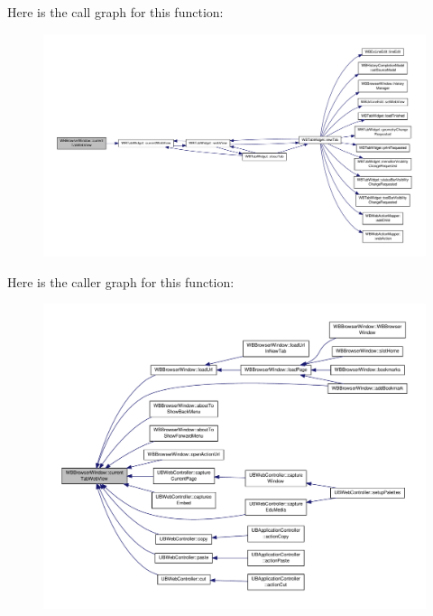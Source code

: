 Here is the call graph for this function\-:
\nopagebreak
\begin{figure}[H]
\begin{center}
\leavevmode
\includegraphics[width=350pt]{d4/d1c/class_w_b_browser_window_a43b315ee4ca51f564a80369546af43de_cgraph}
\end{center}
\end{figure}




Here is the caller graph for this function\-:
\nopagebreak
\begin{figure}[H]
\begin{center}
\leavevmode
\includegraphics[width=350pt]{d4/d1c/class_w_b_browser_window_a43b315ee4ca51f564a80369546af43de_icgraph}
\end{center}
\end{figure}


